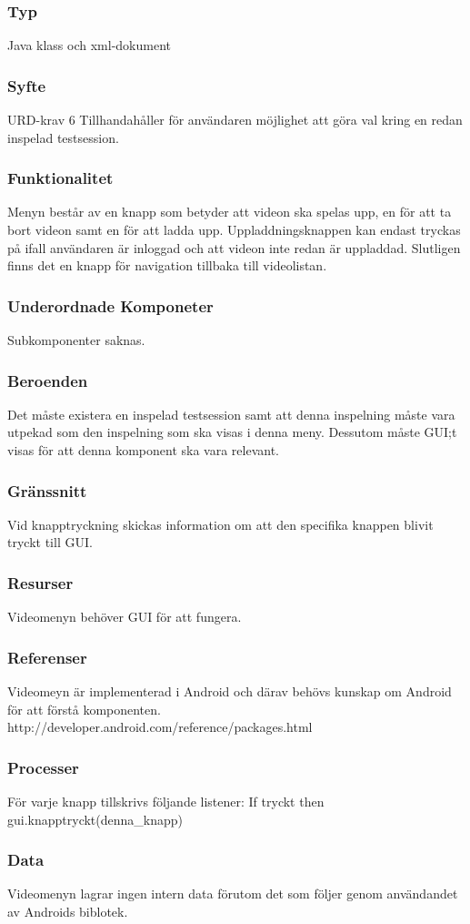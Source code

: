 \subsubsection{Typ}
Java klass och xml-dokument

\subsubsection{Syfte}
URD-krav 6
Tillhandahåller för användaren möjlighet att göra val kring en redan inspelad testsession.

\subsubsection{Funktionalitet}
Menyn består av en knapp som betyder att videon ska spelas upp, en för att ta bort videon samt en för att ladda upp. Uppladdningsknappen kan endast tryckas på ifall användaren är inloggad och att videon inte redan är uppladdad. Slutligen finns det en knapp för navigation tillbaka till videolistan.

\subsubsection{Underordnade Komponeter}
Subkomponenter saknas.

\subsubsection{Beroenden}
Det måste existera en inspelad testsession samt att denna inspelning måste vara utpekad som den inspelning som ska visas i denna meny. Dessutom måste GUI;t visas för att denna komponent ska vara relevant.

\subsubsection{Gränssnitt}
Vid knapptryckning skickas information om att den specifika knappen blivit tryckt till GUI.

\subsubsection{Resurser}
Videomenyn behöver GUI för att fungera.

\subsubsection{Referenser}
Videomeyn är implementerad i Android och därav behövs kunskap om Android för att förstå komponenten.
http://developer.android.com/reference/packages.html

\subsubsection{Processer}
För varje knapp tillskrivs följande listener:
If tryckt
then gui.knapptryckt(denna_knapp)

\subsubsection{Data}
Videomenyn lagrar ingen intern data förutom det som följer genom användandet av Androids biblotek.